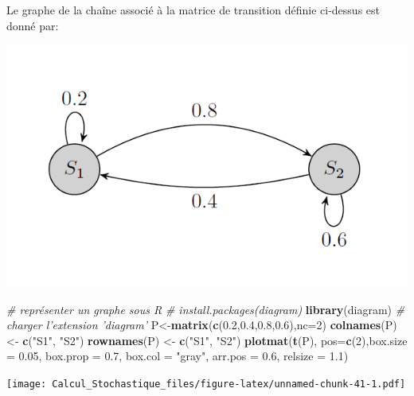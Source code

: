 \documentclass[
]{book}
\newenvironment{Shaded}{\begin{snugshade}}{\end{snugshade}}
\newcommand{\CommentTok}[1]{\textcolor[rgb]{0.56,0.35,0.01}{\textit{#1}}}
\newcommand{\DataTypeTok}[1]{\textcolor[rgb]{0.13,0.29,0.53}{#1}}
\newcommand{\DecValTok}[1]{\textcolor[rgb]{0.00,0.00,0.81}{#1}}
\newcommand{\FloatTok}[1]{\textcolor[rgb]{0.00,0.00,0.81}{#1}}
\newcommand{\KeywordTok}[1]{\textcolor[rgb]{0.13,0.29,0.53}{\textbf{#1}}}
\newcommand{\NormalTok}[1]{#1}
\newcommand{\StringTok}[1]{\textcolor[rgb]{0.31,0.60,0.02}{#1}}
\theoremstyle{definition}
\theoremstyle{definition}
\theoremstyle{definition}
\theoremstyle{remark}
\begin{document}
Le graphe de la chaîne associé à la matrice de transition définie ci-dessus est donné par:

\begin{center}\includegraphics[width=8.36in]{images/graph1} \end{center}

\begin{Shaded}
\begin{Highlighting}[]
\CommentTok{# représenter un graphe sous R}
\CommentTok{# install.packages(diagram)}
\KeywordTok{library}\NormalTok{(diagram) }\CommentTok{# charger l'extension 'diagram'}
\NormalTok{P<-}\KeywordTok{matrix}\NormalTok{(}\KeywordTok{c}\NormalTok{(}\FloatTok{0.2}\NormalTok{,}\FloatTok{0.4}\NormalTok{,}\FloatTok{0.8}\NormalTok{,}\FloatTok{0.6}\NormalTok{),}\DataTypeTok{nc=}\DecValTok{2}\NormalTok{)}
\KeywordTok{colnames}\NormalTok{(P) <-}\StringTok{ }\KeywordTok{c}\NormalTok{(}\StringTok{"S1"}\NormalTok{, }\StringTok{"S2"}\NormalTok{)}
\KeywordTok{rownames}\NormalTok{(P) <-}\StringTok{ }\KeywordTok{c}\NormalTok{(}\StringTok{"S1"}\NormalTok{, }\StringTok{"S2"}\NormalTok{)}
\KeywordTok{plotmat}\NormalTok{(}\KeywordTok{t}\NormalTok{(P), }\DataTypeTok{pos=}\KeywordTok{c}\NormalTok{(}\DecValTok{2}\NormalTok{),}\DataTypeTok{box.size =} \FloatTok{0.05}\NormalTok{, }\DataTypeTok{box.prop =} \FloatTok{0.7}\NormalTok{, }
      \DataTypeTok{box.col =} \StringTok{"gray"}\NormalTok{, }\DataTypeTok{arr.pos =} \FloatTok{0.6}\NormalTok{, }\DataTypeTok{relsize =} \FloatTok{1.1}\NormalTok{)}
\end{Highlighting}
\end{Shaded}

\texttt{[image: Calcul\_Stochastique\_files/figure-latex/unnamed-chunk-41-1.pdf]}
\end{document}
